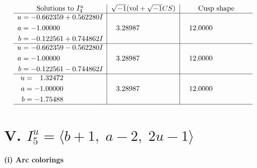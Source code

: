 \documentclass[1p]{elsarticle_modified}
\theoremstyle{definition}
\newcommand{\I}{\sqrt{-1}}
\begin{document}
$$\begin{array}{c|c|c}  
\text{Solutions to }I^u_{4}& \I (\text{vol} + \sqrt{-1}CS) & \text{Cusp shape}\\
 \hline 
\begin{aligned}
u &= -0.662359 + 0.562280 I \\
a &= -1.00000\phantom{ +0.000000I} \\
b &= -0.122561 + 0.744862 I\end{aligned}
 & \phantom{-}3.28987\phantom{ +0.000000I} & \phantom{-}12.0000\phantom{ +0.000000I} \\ \hline\begin{aligned}
u &= -0.662359 - 0.562280 I \\
a &= -1.00000\phantom{ +0.000000I} \\
b &= -0.122561 - 0.744862 I\end{aligned}
 & \phantom{-}3.28987\phantom{ +0.000000I} & \phantom{-}12.0000\phantom{ +0.000000I} \\ \hline\begin{aligned}
u &= \phantom{-}1.32472\phantom{ +0.000000I} \\
a &= -1.00000\phantom{ +0.000000I} \\
b &= -1.75488\phantom{ +0.000000I}\end{aligned}
 & \phantom{-}3.28987\phantom{ +0.000000I} & \phantom{-}12.0000\phantom{ +0.000000I}\\
 \hline 
 \end{array}$$\newpage\newpage\renewcommand{\arraystretch}{1}
\centering \section*{V. $I^u_{5}= \langle b+1,\;a-2,\;2 u-1 \rangle$}
\flushleft \textbf{(i) Arc colorings}\\
\end{document}
